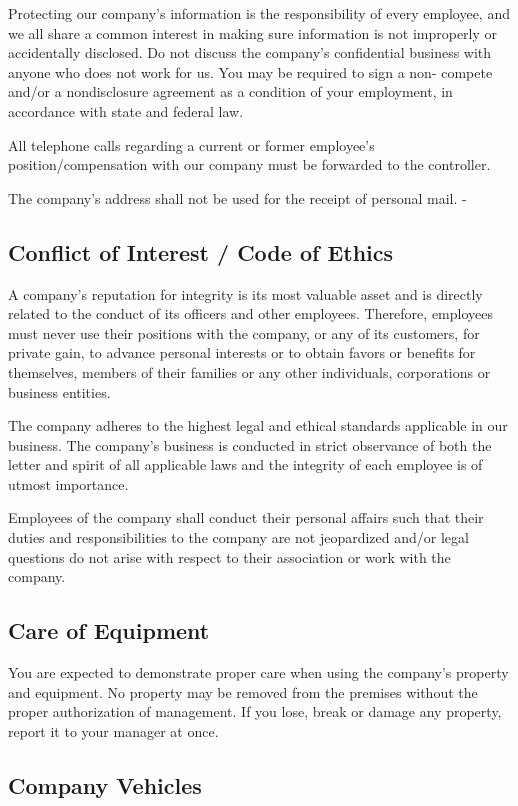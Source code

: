 Protecting our company's information is the responsibility of every employee, and we all share a common interest in making sure information is not improperly or accidentally disclosed. Do not discuss the company's confidential business with anyone who does not work for us. You may be required to sign a non- compete and/or a nondisclosure agreement as a condition of your employment, in accordance with state and federal law.

All telephone calls regarding a current or former employee's position/compensation with our company must be forwarded to the controller.

The company's address shall not be used for the receipt of personal mail. -

\subsection{Conflict of Interest / Code of Ethics}

A company's reputation for integrity is its most valuable asset and is directly related to the conduct of its officers and other employees. Therefore, employees must never use their positions with the company, or any of its customers, for private gain, to advance personal interests or to obtain favors or benefits for themselves, members of their families or any other individuals, corporations or business entities.

The company adheres to the highest legal and ethical standards applicable in our business. The company's business is conducted in strict observance of both the letter and spirit of all applicable laws and the integrity of each employee is of utmost importance.

Employees of the company shall conduct their personal affairs such that their duties and responsibilities to the company are not jeopardized and/or legal questions do not arise with respect to their association or work with the company.

\subsection{Care of Equipment}

You are expected to demonstrate proper care when using the company's property and equipment. No property may be removed from the premises without the proper authorization of management. If you lose, break or damage any property, report it to your manager at once.

\subsection{Company Vehicles}

